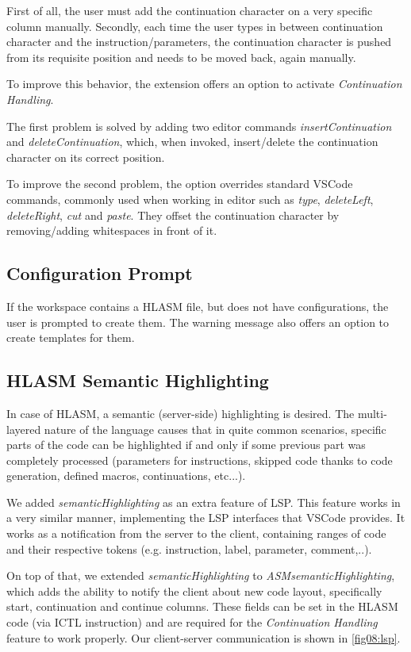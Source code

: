 First of all, the user must add the continuation character on a very specific column manually. Secondly, each time the user types in between continuation character and the instruction/parameters, the continuation character is pushed from its requisite position and needs to be moved back, again manually.

To improve this behavior, the extension offers an option to activate \emph{Continuation Handling}. 

The first problem is solved by adding two editor commands \emph{insertContinuation} and \emph{deleteContinuation}, which, when invoked, insert/delete the continuation character on its correct position.

To improve the second problem, the option overrides standard VSCode commands, commonly used when working in editor such as \emph{type}, \emph{deleteLeft}, \emph{deleteRight}, \emph{cut} and \emph{paste}. They offset the continuation character by removing/adding whitespaces in front of it.


\subsection{Configuration Prompt}

If the workspace contains a HLASM file, but does not have configurations, the user is prompted to create them. The warning message also offers an option to create templates for them.

\subsection{HLASM Semantic Highlighting}

In case of HLASM, a semantic (server-side) highlighting is desired. The multi-layered nature of the language causes that in quite common scenarios, specific parts of the code can be highlighted if and only if some previous part was completely processed (parameters for instructions, skipped code thanks to code generation, defined macros, continuations, etc...).

We added \emph{semanticHighlighting} as an extra feature of LSP. This feature works in a very similar manner, implementing the LSP interfaces that VSCode provides. It works as a notification from the server to the client, containing ranges of code and their respective tokens (e.g. instruction, label, parameter, comment,..). 

On top of that, we extended \emph{semanticHighlighting} to \emph{ASMsemanticHighlighting}, which adds the ability to notify the client about new code layout, specifically start, continuation and continue columns. These fields can be set in the HLASM code (via ICTL instruction) and are required for the \emph{Continuation Handling} feature to work properly. Our client-server communication is shown in \cref{fig08:lsp}.



